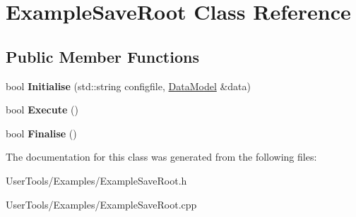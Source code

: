 \hypertarget{classExampleSaveRoot}{
\section{ExampleSaveRoot Class Reference}
\label{classExampleSaveRoot}
}
\subsection*{Public Member Functions}
\begin{DoxyCompactItemize}
\item 
\hypertarget{classExampleSaveRoot_a71c138625e281936faa6febe787a4f24}{
bool {\bfseries Initialise} (std::string configfile, \hyperlink{classDataModel}{DataModel} \&data)}
\label{classExampleSaveRoot_a71c138625e281936faa6febe787a4f24}

\item 
\hypertarget{classExampleSaveRoot_a5068a1d780f454298301ee6f26ac4357}{
bool {\bfseries Execute} ()}
\label{classExampleSaveRoot_a5068a1d780f454298301ee6f26ac4357}

\item 
\hypertarget{classExampleSaveRoot_a06f29407ff26756770b6e60eedae8ebf}{
bool {\bfseries Finalise} ()}
\label{classExampleSaveRoot_a06f29407ff26756770b6e60eedae8ebf}

\end{DoxyCompactItemize}


The documentation for this class was generated from the following files:\begin{DoxyCompactItemize}
\item 
UserTools/Examples/ExampleSaveRoot.h\item 
UserTools/Examples/ExampleSaveRoot.cpp\end{DoxyCompactItemize}
